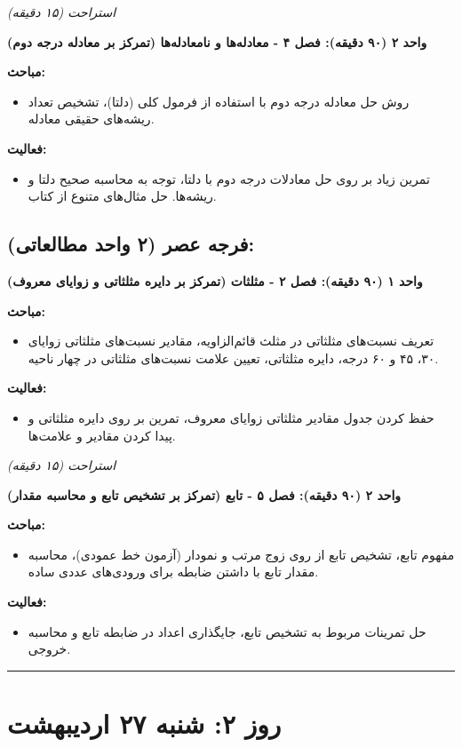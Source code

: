 \documentclass[12pt,a4paper]{article}
\newcommand{\studyunit}[1]{\par\medskip\noindent\textbf{#1}\par\nopagebreak}
\newcommand{\topics}{\par\medskip\noindent\textbf{مباحث:}\begin{itemize}[nosep,after=\vspace{-0.5\baselineskip}]}
\newcommand{\activities}{\par\medskip\noindent\textbf{فعالیت:}\begin{itemize}[nosep,after=\vspace{-0.5\baselineskip}]}
\newcommand{\breaktime}[1]{\par\smallskip\centerline{\textit{#1}}\smallskip}
\begin{document}
    \breaktime{استراحت (۱۵ دقیقه)}

    \studyunit{واحد ۲ (۹۰ دقیقه): فصل ۴ - معادله‌ها و نامعادله‌ها (تمرکز بر معادله درجه دوم)}
        \topics
            \item روش حل معادله درجه دوم با استفاده از فرمول کلی (دلتا)، تشخیص تعداد ریشه‌های حقیقی معادله.
        \end{itemize}
        \activities
            \item تمرین زیاد بر روی حل معادلات درجه دوم با دلتا، توجه به محاسبه صحیح دلتا و ریشه‌ها. حل مثال‌های متنوع از کتاب.
        \end{itemize}

\subsection*{فرجه عصر (۲ واحد مطالعاتی):}
    \studyunit{واحد ۱ (۹۰ دقیقه): فصل ۲ - مثلثات (تمرکز بر دایره مثلثاتی و زوایای معروف)}
        \topics
            \item تعریف نسبت‌های مثلثاتی در مثلث قائم‌الزاویه، مقادیر نسبت‌های مثلثاتی زوایای ۳۰، ۴۵ و ۶۰ درجه، دایره مثلثاتی، تعیین علامت نسبت‌های مثلثاتی در چهار ناحیه.
        \end{itemize}
        \activities
            \item حفظ کردن جدول مقادیر مثلثاتی زوایای معروف، تمرین بر روی دایره مثلثاتی و پیدا کردن مقادیر و علامت‌ها.
        \end{itemize}

    \breaktime{استراحت (۱۵ دقیقه)}

    \studyunit{واحد ۲ (۹۰ دقیقه): فصل ۵ - تابع (تمرکز بر تشخیص تابع و محاسبه مقدار)}
        \topics
            \item مفهوم تابع، تشخیص تابع از روی زوج مرتب و نمودار (آزمون خط عمودی)، محاسبه مقدار تابع با داشتن ضابطه برای ورودی‌های عددی ساده.
        \end{itemize}
        \activities
            \item حل تمرینات مربوط به تشخیص تابع، جایگذاری اعداد در ضابطه تابع و محاسبه خروجی.
        \end{itemize}

\rule{\linewidth}{0.4pt}\vspace{1em} %

\section*{روز ۲: شنبه ۲۷ اردیبهشت}
\end{document}
